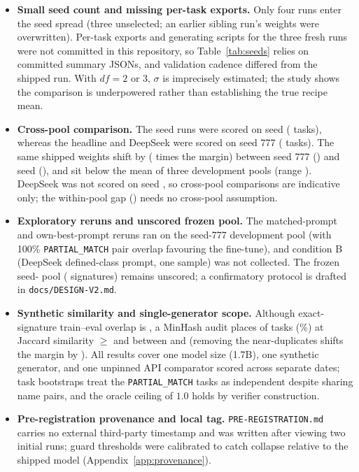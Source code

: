 \documentclass[11pt]{article}
\begin{document}
\begin{itemize}\setlength\itemsep{1pt}\setlength\parskip{0pt}
\item \textbf{Small seed count and missing per-task exports.} Only four runs enter the seed spread (three unselected; an earlier sibling run's weights were overwritten). Per-task exports and generating scripts for the three fresh runs were not committed in this repository, so Table~\ref{tab:seeds} relies on committed summary JSONs, and validation cadence differed from the shipped run. With $df = 2$ or $3$, $\sigma$ is imprecisely estimated; the study shows the comparison is underpowered rather than establishing the true recipe mean.
\item \textbf{Cross-pool comparison.} The seed runs were scored on seed \devPoolSeed{} (\nPoolTasks{} tasks), whereas the headline and DeepSeek were scored on seed 777 (\nBench{} tasks). The same shipped weights shift by \poolShift{} (\poolShiftOverMargin{} times the margin) between seed 777 (\rwChampPoolBench{}) and seed \devPoolSeed{} (\rwShipped{}), and sit \poolMeanShift{} below the mean of three development pools (range \evalPoolRange{}). DeepSeek was not scored on seed \devPoolSeed{}, so cross-pool comparisons are indicative only; the within-pool gap (\shipGapFresh{}) needs no cross-pool assumption.
\item \textbf{Exploratory reruns and unscored frozen pool.} The matched-prompt and own-best-prompt reruns ran on the seed-777 development pool (with 100\% \texttt{PARTIAL\_MATCH} pair overlap favouring the fine-tune), and condition B (DeepSeek defined-class prompt, one sample) was not collected. The frozen seed-\frozenSeed{} pool (\nFrozen{} signatures) remains unscored; a confirmatory protocol is drafted in \texttt{docs/DESIGN-V2.md}.
\item \textbf{Synthetic similarity and single-generator scope.} Although exact-signature train--eval overlap is \exactOverlap{}, a MinHash audit places \nearDup{} of \nBench{} tasks (\nearDupPct{}\%) at Jaccard similarity $\ge$ \nnHigh{} and \nMidBand{} between \nnFloor{} and \nnHigh{} (removing the \nearDup{} near-duplicates shifts the margin by \dedupShift{}). All results cover one model size (1.7B), one synthetic generator, and one unpinned API comparator scored across separate dates; task bootstraps treat the \partialN{} \texttt{PARTIAL\_MATCH} tasks as independent despite sharing \pmPairs{} name pairs, and the oracle ceiling of $1.0$ holds by verifier construction.
\item \textbf{Pre-registration provenance and local tag.} \texttt{PRE-REGISTRATION.md} carries no external third-party timestamp and was written after viewing two initial runs; guard thresholds were calibrated to catch collapse relative to the shipped model (Appendix~\ref{app:provenance}).
\end{itemize}
\end{document}
